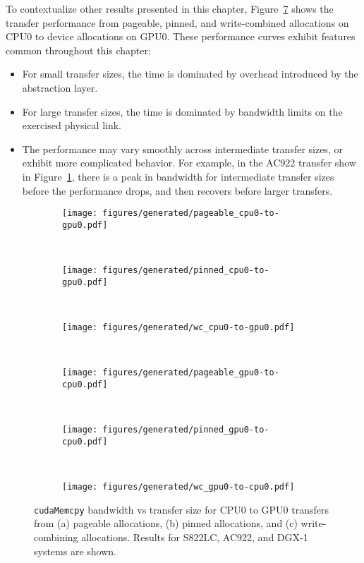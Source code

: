 To contextualize other results presented in this chapter, Figure~\ref{fig:pageable-pinned-wc} shows the transfer performance from pageable, pinned, and write-combined allocations on CPU0 to device allocations on GPU0.
These performance curves exhibit features common throughout this chapter:
\begin{itemize}
	\item For small transfer sizes, the time is dominated by overhead introduced by the abstraction layer.
	\item For large transfer sizes, the time is dominated by bandwidth limits on the exercised physical link.
	\item The performance may vary smoothly across intermediate transfer sizes, or exhibit more complicated behavior.
	For example, in the AC922 transfer show in Figure~\ref{fig:pageable-cpu0-gpu0}, there is a peak in bandwidth for intermediate transfer sizes before the performance drops, and then recovers before larger transfers.
\end{itemize}

\begin{figure}[H]
	\centering
	\begin{subfigure}[b]{0.3\textwidth}
		\texttt{[image: figures/generated/pageable\_cpu0-to-gpu0.pdf]}
		\caption{}
		\label{fig:pageable-cpu0-gpu0}
	\end{subfigure}
	~
	\begin{subfigure}[b]{0.3\textwidth}
		\texttt{[image: figures/generated/pinned\_cpu0-to-gpu0.pdf]}
		\caption{}
		\label{fig:pinned-cpu0-gpu0}
	\end{subfigure}
	~
	\begin{subfigure}[b]{0.3\textwidth}
		\texttt{[image: figures/generated/wc\_cpu0-to-gpu0.pdf]}
		\caption{}
		\label{fig:wc-cpu0-gpu0}
	\end{subfigure}
	\\
	\begin{subfigure}[b]{0.3\textwidth}
		\texttt{[image: figures/generated/pageable\_gpu0-to-cpu0.pdf]}
		\caption{}
		\label{fig:pageable-gpu0-cpu0}
	\end{subfigure}
	~
	\begin{subfigure}[b]{0.3\textwidth}
		\texttt{[image: figures/generated/pinned\_gpu0-to-cpu0.pdf]}
		\caption{}
		\label{fig:pinned-gpu0-cpu0}
	\end{subfigure}
	~
	\begin{subfigure}[b]{0.3\textwidth}
		\texttt{[image: figures/generated/wc\_gpu0-to-cpu0.pdf]}
		\caption{}
		\label{fig:wc-gpu0-cpu0}
	\end{subfigure}
	\caption[\texttt{cudaMemcpy} bandwidth for CPU0-GPU0 transfers.]{
		\texttt{cudaMemcpy} bandwidth vs transfer size for CPU0 to GPU0 transfers from 
		(a) pageable allocations,
		(b) pinned allocations, and
		(c) write-combining allocations.
		Results for S822LC, AC922, and DGX-1 systems are shown.
	}
	\label{fig:pageable-pinned-wc}
\end{figure}


